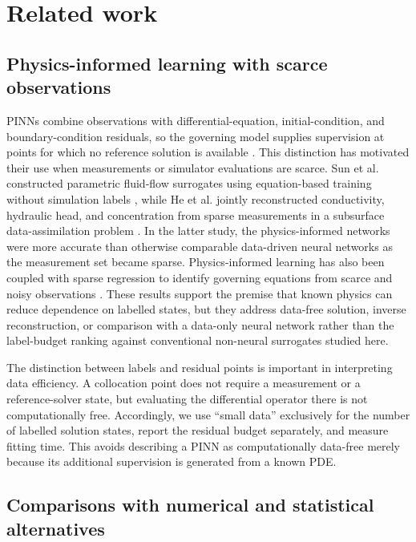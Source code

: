 \section{Related work}
\label{sec:related_work}

\subsection{Physics-informed learning with scarce observations}

PINNs combine observations with differential-equation, initial-condition, and boundary-condition residuals, so the governing model supplies supervision at points for which no reference solution is available \cite{Raissi2019,Karniadakis2021}. This distinction has motivated their use when measurements or simulator evaluations are scarce. Sun et al. constructed parametric fluid-flow surrogates using equation-based training without simulation labels \cite{Sun2020}, while He et al. jointly reconstructed conductivity, hydraulic head, and concentration from sparse measurements in a subsurface data-assimilation problem \cite{He2020}. In the latter study, the physics-informed networks were more accurate than otherwise comparable data-driven neural networks as the measurement set became sparse. Physics-informed learning has also been coupled with sparse regression to identify governing equations from scarce and noisy observations \cite{Chen2021}. These results support the premise that known physics can reduce dependence on labelled states, but they address data-free solution, inverse reconstruction, or comparison with a data-only neural network rather than the label-budget ranking against conventional non-neural surrogates studied here.

The distinction between labels and residual points is important in interpreting data efficiency. A collocation point does not require a measurement or a reference-solver state, but evaluating the differential operator there is not computationally free. Accordingly, we use ``small data'' exclusively for the number of labelled solution states, report the residual budget separately, and measure fitting time. This avoids describing a PINN as computationally data-free merely because its additional supervision is generated from a known PDE.

\subsection{Comparisons with numerical and statistical alternatives}


